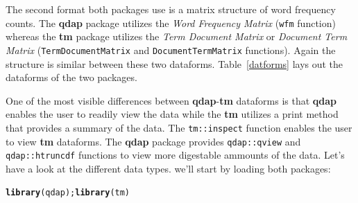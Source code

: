\documentclass{article}\usepackage[]{graphicx}\usepackage[]{color}
\makeatletter
\newcommand{\hlstd}[1]{\textcolor[rgb]{0.345,0.345,0.345}{#1}}%
\newcommand{\hlkwd}[1]{\textcolor[rgb]{0.737,0.353,0.396}{\textbf{#1}}}%
\newenvironment{kframe}{%
 \def\at@end@of@kframe{}%
 \ifinner\ifhmode%
  \def\at@end@of@kframe{\end{minipage}}%
  \begin{minipage}{\columnwidth}%
 \fi\fi%
 \def\FrameCommand##1{\hskip\@totalleftmargin \hskip-\fboxsep
 \colorbox{shadecolor}{##1}\hskip-\fboxsep
     \hskip-\linewidth \hskip-\@totalleftmargin \hskip\columnwidth}%
 \MakeFramed {\advance\hsize-\width
   \@totalleftmargin\z@ \linewidth\hsize
   \@setminipage}}%
 {\par\unskip\endMakeFramed%
 \at@end@of@kframe}
\newenvironment{knitrout}{}{} %
\makeatother
\begin{document}
The second format both packages use is a matrix structure of word frequency counts.  The \textbf{qdap} package utilizes the \emph{Word Frequency Matrix} (\texttt{wfm} function) whereas the \textbf{tm} package utilizes the \emph{Term Document Matrix} or \emph{Document Term Matrix} (\texttt{TermDocumentMatrix} and \texttt{DocumentTermMatrix} functions).  Again the structure is similar between these two dataforms.  Table~\ref{datforms} lays out the dataforms of the two packages.



\begin{singlespace}
\begin{table}[!ht]
\begin{center}
\end{center}
\end{table}
\end{singlespace}

One of the most visible differences between \textbf{qdap}-\textbf{tm} dataforms is that \textbf{qdap} enables the user to readily view the data while the \textbf{tm} utilizes a print method that provides a summary of the data.  The \texttt{tm::inspect} function enables the user to view \textbf{tm} dataforms. The \textbf{qdap} package provides \texttt{qdap::qview} and \texttt{qdap::htruncdf} functions to view more digestable ammounts of the data. Let's have a look at the different data types.  we'll start by loading both packages:


\begin{knitrout}
\color{fgcolor}\begin{kframe}
\begin{alltt}
\hlkwd{library}\hlstd{(qdap);} \hlkwd{library}\hlstd{(tm)}
\end{alltt}
\end{kframe}
\end{knitrout}
\end{document}
